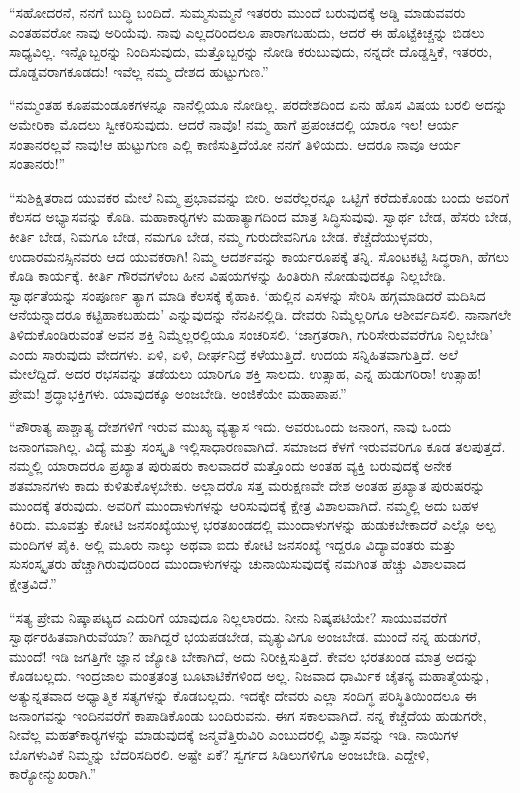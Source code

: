  “ಸಹೋದರನೆ, ನನಗೆ ಬುದ್ಧಿ ಬಂದಿದೆ. ಸುಮ್ಮಸುಮ್ಮನೆ ಇತರರು ಮುಂದೆ ಬರುವುದಕ್ಕೆ ಅಡ್ಡಿ ಮಾಡುವವರು ಎಂತಹವರೋ ನಾವು ಅರಿಯೆವು. ನಾವು ಎಲ್ಲದರಿಂದಲೂ ಪಾರಾಗಬಹುದು, ಆದರೆ ಈ ಹೊಟ್ಟೆಕಿಚ್ಚನ್ನು ಬಿಡಲು ಸಾಧ್ಯವಿಲ್ಲ. ಇನ್ನೊಬ್ಬರನ್ನು ನಿಂದಿಸುವುದು, ಮತ್ತೊಬ್ಬರನ್ನು ನೋಡಿ ಕರುಬುವುದು, ನನ್ನದೇ ದೊಡ್ಡಸ್ತಿಕೆ, ಇತರರು, ದೊಡ್ಡವರಾಗಕೂಡದು! ಇವೆಲ್ಲ ನಮ್ಮ ದೇಶದ ಹುಟ್ಟುಗುಣ.” 

 “ನಮ್ಮಂತಹ ಕೂಪಮಂಡೂಕಗಳನ್ನೂ ನಾನೆಲ್ಲಿಯೂ ನೋಡಿಲ್ಲ. ಪರದೇಶದಿಂದ ಏನು ಹೊಸ ವಿಷಯ ಬರಲಿ ಅದನ್ನು ಅಮೇರಿಕಾ ಮೊದಲು ಸ್ವೀಕರಿಸುವುದು. ಆದರೆ ನಾವೊ! ನಮ್ಮ ಹಾಗೆ ಪ್ರಪಂಚದಲ್ಲಿ ಯಾರೂ ಇಲ! ಆರ್ಯ ಸಂತಾನರಲ್ಲವೆ ನಾವು!‌ಆ ಹುಟ್ಟುಗುಣ ಎಲ್ಲಿ ಕಾಣಿಸುತ್ತಿದೆಯೋ ನನಗೆ ತಿಳಿಯದು. ಆದರೂ ನಾವೂ ಆರ್ಯ ಸಂತಾನರು!” 

 “ಸುಶಿಕ್ಷಿತರಾದ ಯುವಕರ ಮೇಲೆ ನಿಮ್ಮ ಪ್ರಭಾವವನ್ನು ಬೀರಿ. ಅವರೆಲ್ಲರನ್ನೂ ಒಟ್ಟಿಗೆ ಕರೆದುಕೊಂಡು ಬಂದು ಅವರಿಗೆ ಕೆಲಸದ ಅಭ್ಯಾಸವನ್ನು ಕೊಡಿ. ಮಹಾಕಾರ‍್ಯಗಳು ಮಹಾತ್ಯಾಗದಿಂದ ಮಾತ್ರ ಸಿದ್ಧಿಸುವುವು. ಸ್ವಾರ್ಥ ಬೇಡ, ಹೆಸರು ಬೇಡ, ಕೀರ್ತಿ ಬೇಡ, ನಿಮಗೂ ಬೇಡ, ನಮಗೂ ಬೇಡ, ನಮ್ಮ ಗುರುದೇವನಿಗೂ ಬೇಡ. ಕೆಚ್ಚೆದೆಯುಳ್ಳವರು, ಉದಾರಮನಸ್ಸಿನವರು ಆದ ಯುವಕರಾಗಿ! ನಿಮ್ಮ ಆದರ್ಶವನ್ನು ಕಾರ್ಯರೂಪಕ್ಕೆ ತನ್ನಿ. ಸೊಂಟಕಟ್ಟಿ ಸಿದ್ಧರಾಗಿ, ಹೆಗಲು ಕೊಡಿ ಕಾರ್ಯಕ್ಕೆ. ಕೀರ್ತಿ ಗೌರವಗಳೆಂಬ ಹೀನ ವಿಷಯಗಳನ್ನು ಹಿಂತಿರುಗಿ ನೋಡುವುದಕ್ಕೂ ನಿಲ್ಲಬೇಡಿ. ಸ್ವಾರ್ಥತೆಯನ್ನು ಸಂಪೂರ್ಣ ತ್ಯಾಗ ಮಾಡಿ ಕೆಲಸಕ್ಕೆ ಕೈಹಾಕಿ. ‘ಹುಲ್ಲಿನ ಎಸಳನ್ನು ಸೇರಿಸಿ ಹಗ್ಗಮಾಡಿದರೆ ಮದಿಸಿದ ಆನೆಯನ್ನಾದರೂ ಕಟ್ಟಿಹಾಕಬಹುದು’ ಎನ್ನುವುದನ್ನು ನೆನಪಿನಲ್ಲಿಡಿ. ದೇವರು ನಿಮ್ಮೆಲ್ಲರಿಗೂ ಆಶೀರ್ವದಿಸಲಿ. ನಾನಾಗಲೇ ತಿಳಿದುಕೊಂಡಿರುವಂತೆ ಅವನ ಶಕ್ತಿ ನಿಮ್ಮೆಲ್ಲರಲ್ಲಿಯೂ ಸಂಚರಿಸಲಿ. ‘ಜಾಗ್ರತರಾಗಿ, ಗುರಿಸೇರುವವರೆಗೂ ನಿಲ್ಲಬೇಡಿ’ ಎಂದು ಸಾರುವುದು ವೇದಗಳು. ಏಳಿ, ಏಳಿ, ದೀರ್ಘನಿದ್ರೆ ಕಳೆಯುತ್ತಿದೆ. ಉದಯ ಸನ್ನಿಹಿತವಾಗುತ್ತಿದೆ. ಅಲೆ ಮೇಲೆದ್ದಿದೆ. ಅದರ ರಭಸವನ್ನು ತಡೆಯಲು ಯಾರಿಗೂ ಶಕ್ತಿ ಸಾಲದು. ಉತ್ಸಾಹ, ಎನ್ನ ಹುಡುಗರಿರಾ! ಉತ್ಸಾಹ! ಪ್ರೇಮ! ಶ್ರದ್ಧಾಭಕ್ತಿಗಳು. ಯಾವುದಕ್ಕೂ ಅಂಜಬೇಡಿ. ಅಂಜಿಕೆಯೇ ಮಹಾಪಾಪ.” 

 “ಪೌರಾತ್ಯ ಪಾಶ್ಚಾತ್ಯ ದೇಶಗಳಿಗೆ ಇರುವ ಮುಖ್ಯ ವ್ಯತ್ಯಾಸ ಇದು. ಅವರು\break ಒಂದು ಜನಾಂಗ, ನಾವು ಒಂದು ಜನಾಂಗವಾಗಿಲ್ಲ. ವಿದ್ಯೆ ಮತ್ತು ಸಂಸ್ಕೃತಿ ಇಲ್ಲಿ\break ಸಾಧಾರಣವಾಗಿದೆ. ಸಮಾಜದ ಕೆಳಗೆ ಇರುವವರಿಗೂ ಕೂಡ ತಲಪುತ್ತದೆ. ನಮ್ಮಲ್ಲಿ ಯಾರಾದರೂ ಪ್ರಖ್ಯಾತ ಪುರುಷರು ಕಾಲವಾದರೆ ಮತ್ತೊಂದು ಅಂತಹ ವ್ಯಕ್ತಿ ಬರುವುದಕ್ಕೆ ಅನೇಕ ಶತಮಾನಗಳು ಕಾದು ಕುಳಿತುಕೊಳ್ಳಬೇಕು. ಅಲ್ಲಾದರೊ ಸತ್ತ ಮರುಕ್ಷಣವೇ ದೇಶ ಅಂತಹ ಪ್ರಖ್ಯಾತ ಪುರುಷರನ್ನು ಮುಂದಕ್ಕೆ ತರುವುದು. ಅವರಿಗೆ ಮುಂದಾಳುಗಳನ್ನು ಆರಿಸುವುದಕ್ಕೆ ಕ್ಷೇತ್ರ ವಿಶಾಲವಾಗಿದೆ. ನಮ್ಮಲ್ಲಿ ಅದು ಬಹಳ ಕಿರಿದು. ಮೂವತ್ತು ಕೋಟಿ ಜನಸಂಖ್ಯೆಯುಳ್ಳ ಭರತಖಂಡದಲ್ಲಿ ಮುಂದಾಳುಗಳನ್ನು ಹುಡುಕಬೇಕಾದರೆ ಎಲ್ಲೊ ಅಲ್ಪ ಮಂದಿಗಳ ಪೈಕಿ. ಅಲ್ಲಿ ಮೂರು ನಾಲ್ಕು ಅಥವಾ ಐದು ಕೋಟಿ ಜನಸಂಖ್ಯೆ ಇದ್ದರೂ ವಿದ್ಯಾವಂತರು ಮತ್ತು ಸುಸಂಸ್ಕೃತರು ಹೆಚ್ಚಾಗಿರುವುದರಿಂದ ಮುಂದಾಳುಗಳನ್ನು ಚುನಾಯಿಸುವುದಕ್ಕೆ ನಮಗಿಂತ ಹೆಚ್ಚು ವಿಶಾಲವಾದ ಕ್ಷೇತ್ರವಿದೆ.” 

 “ಸತ್ಯ ಪ್ರೇಮ ನಿಷ್ಕಾಪಟ್ಯದ ಎದುರಿಗೆ ಯಾವುದೂ ನಿಲ್ಲಲಾರದು. ನೀನು ನಿಷ್ಕಪಟಿಯೇ? ಸಾಯುವವರೆಗೆ ಸ್ವಾರ್ಥರಹಿತವಾಗಿರುವೆಯಾ? ಹಾಗಿದ್ದರೆ ಭಯಪಡಬೇಡ, ಮೃತ್ಯುವಿಗೂ ಅಂಜಬೇಡ. ಮುಂದೆ ನನ್ನ ಹುಡುಗರೆ, ಮುಂದೆ! ಇಡಿ ಜಗತ್ತಿಗೇ ಜ್ಞಾನ ಜ್ಯೋತಿ ಬೇಕಾಗಿದೆ, ಅದು ನಿರೀಕ್ಷಿಸುತ್ತಿದೆ. ಕೇವಲ ಭರತಖಂಡ ಮಾತ್ರ ಅದನ್ನು ಕೊಡಬಲ್ಲದು. ಇಂದ್ರಜಾಲ ಮಂತ್ರತಂತ್ರ ಬೂಟಾಟಿಕೆಗಳಿಂದ ಅಲ್ಲ. ನಿಜವಾದ ಧಾರ್ಮಿಕ ಚೈತನ್ಯ ಮಹಾತ್ಮೆಯನ್ನು, ಅತ್ಯುನ್ನತವಾದ ಅಧ್ಯಾತ್ಮಿಕ ಸತ್ಯಗಳನ್ನು ಕೊಡಬಲ್ಲದು. ಇದಕ್ಕೇ ದೇವರು ಎಲ್ಲಾ ಸಂದಿಗ್ಧ ಪರಿಸ್ಥಿತಿಯಿಂದಲೂ ಈ ಜನಾಂಗವನ್ನು ಇಂದಿನವರೆಗೆ ಕಾಪಾಡಿಕೊಂಡು ಬಂದಿರುವನು. ಈಗ ಸಕಾಲವಾಗಿದೆ. ನನ್ನ ಕೆಚ್ಚೆದೆಯ ಹುಡುಗರೇ, ನೀವೆಲ್ಲ ಮಹತ್‍ಕಾರ‍್ಯಗಳನ್ನು ಮಾಡುವುದಕ್ಕೆ ಜನ್ಮವೆತ್ತಿರುವಿರಿ ಎಂಬುದರಲ್ಲಿ ವಿಶ್ವಾಸವನ್ನು ಇಡಿ. ನಾಯಿಗಳ ಬೊಗಳುವಿಕೆ ನಿಮ್ಮನ್ನು ಬೆದರಿಸದಿರಲಿ. ಅಷ್ಟೇ ಏಕೆ? ಸ್ವರ್ಗದ ಸಿಡಿಲುಗಳಿಗೂ ಅಂಜಬೇಡಿ. ಎದ್ದೇಳಿ, ಕಾರ‍್ಯೋನ್ಮುಖರಾಗಿ.” 

